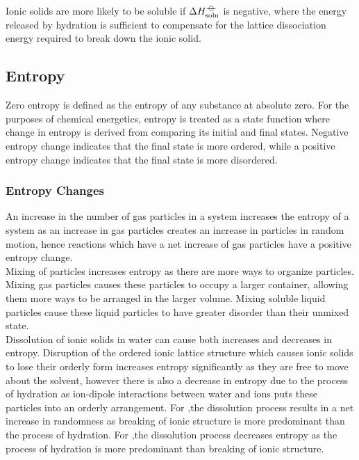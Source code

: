 \documentclass[../main]{subfiles}
\begin{document}
	Ionic solids are more likely to be soluble if \(\Delta H_\text{soln}^{-\kern-4pt{\ominus}\kern-4pt-}\) is negative, where the energy released by hydration is sufficient to compensate for the lattice dissociation energy required to break down the ionic solid.

	\subsection{Entropy}


	Zero entropy is defined as the entropy of any substance at absolute zero. For the purposes of chemical energetics, entropy is treated as a state function where change in entropy is derived from comparing its initial and final states. Negative entropy change indicates that the final state is more ordered, while a positive entropy change indicates that the final state is more disordered.

	\subsubsection{Entropy Changes}

	An increase in the number of gas particles in a system increases the entropy of a system as an increase in gas particles creates an increase in particles in random motion, hence reactions which have a net increase of gas particles have a positive entropy change. \\

	Mixing of particles increases entropy as there are more ways to organize particles. Mixing gas particles causes these particles to occupy a larger container, allowing them more ways to be arranged in the larger volume. Mixing soluble liquid particles cause these liquid particles to have greater disorder than their unmixed state. \\

	Dissolution of ionic solids in water can cause both increases and decreases in entropy. Disruption of the ordered ionic lattice structure which causes ionic solids to lose their orderly form increases entropy significantly as they are free to move about the solvent, however there is also a decrease in entropy due to the process of hydration as ion-dipole interactions between water and ions puts these particles into an orderly arrangement. For ,the dissolution process results in a net increase in randomness as breaking of ionic structure is more predominant than the process of hydration. For ,the dissolution process decreases entropy as the process of hydration is more predominant than breaking of ionic structure. \\
\end{document}
